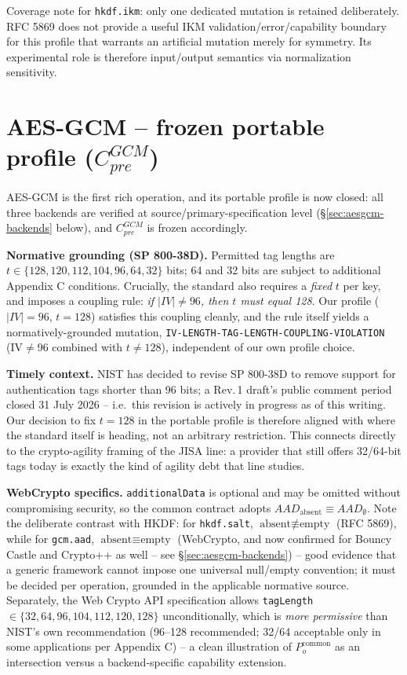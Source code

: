 \documentclass[11pt,a4paper]{article}
\begin{document}
Coverage note for \texttt{hkdf.ikm}: only one dedicated mutation is retained deliberately. RFC 5869 does not provide a useful IKM validation/error/capability boundary for this profile that warrants an artificial mutation merely for symmetry. Its experimental role is therefore input/output semantics via normalization sensitivity.

\section{AES-GCM -- frozen portable profile
\texorpdfstring{($C_{pre}^{GCM}$)}{(Cpre-GCM)}}\label{sec:aesgcm}
AES-GCM is the first rich operation, and its portable profile is now closed: all three backends are verified at source/primary-specification level (\S\ref{sec:aesgcm-backends} below), and $C_{pre}^{GCM}$ is frozen accordingly.

\textbf{Normative grounding (SP 800-38D).} Permitted tag lengths are $t\in\{128,120,112,104,96,64,32\}$ bits; 64 and 32 bits are subject to additional Appendix C conditions. Crucially, the standard also requires a \emph{fixed} $t$ per key, and imposes a coupling rule: \emph{if $|IV|\neq 96$, then $t$ must equal 128}. Our profile ($|IV|=96$, $t=128$) satisfies this coupling cleanly, and the rule itself yields a normatively-grounded mutation, \texttt{IV-LENGTH-TAG-LENGTH-COUPLING-VIOLATION} (IV$\neq$96 combined with $t\neq128$), independent of our own profile choice.

\textbf{Timely context.} NIST has decided to revise SP 800-38D to remove support for authentication tags shorter than 96 bits; a Rev.\,1 draft's public comment period closed 31 July 2026 -- i.e.\ this revision is actively in progress as of this writing. Our decision to fix $t=128$ in the portable profile is therefore aligned with where the standard itself is heading, not an arbitrary restriction. This connects directly to the crypto-agility framing of the JISA line: a provider that still offers 32/64-bit tags today is exactly the kind of agility debt that line studies.

\textbf{WebCrypto specifics.} \texttt{additionalData} is optional and may be omitted without compromising security, so the common contract adopts $AAD_{\text{absent}}\equiv AAD_{\emptyset}$. Note the deliberate contrast with HKDF: for \texttt{hkdf.salt}, $\text{absent}\not\equiv\text{empty}$ (RFC 5869), while for \texttt{gcm.aad}, $\text{absent}\equiv\text{empty}$ (WebCrypto, and now confirmed for Bouncy Castle and Crypto++ as well -- see \S\ref{sec:aesgcm-backends}) -- good evidence that a generic framework cannot impose one universal null/empty convention; it must be decided per operation, grounded in the applicable normative source. Separately, the Web Crypto API specification allows \texttt{tagLength} $\in\{32,64,96,104,112,120,128\}$ unconditionally, which is \emph{more permissive} than NIST's own recommendation (96--128 recommended; 32/64 acceptable only in some applications per Appendix C) -- a clean illustration of $P_o^{\text{common}}$ as an intersection versus a backend-specific capability extension.
\end{document}
